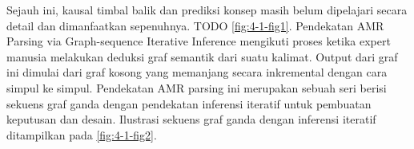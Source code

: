 Sejauh ini, kausal timbal balik dan prediksi konsep masih belum dipelajari secara detail dan dimanfaatkan sepenuhnya.
TODO \cref{fig:4-1-fig1}.
Pendekatan AMR Parsing via Graph-sequence Iterative Inference mengikuti proses ketika expert manusia melakukan deduksi graf semantik dari suatu kalimat.
Output dari graf ini dimulai dari graf kosong yang memanjang secara inkremental dengan cara simpul ke simpul.
Pendekatan AMR parsing ini merupakan sebuah seri berisi sekuens graf ganda dengan pendekatan inferensi iteratif untuk pembuatan keputusan dan desain.
Ilustrasi sekuens graf ganda dengan inferensi iteratif ditampilkan pada \cref{fig:4-1-fig2}.

